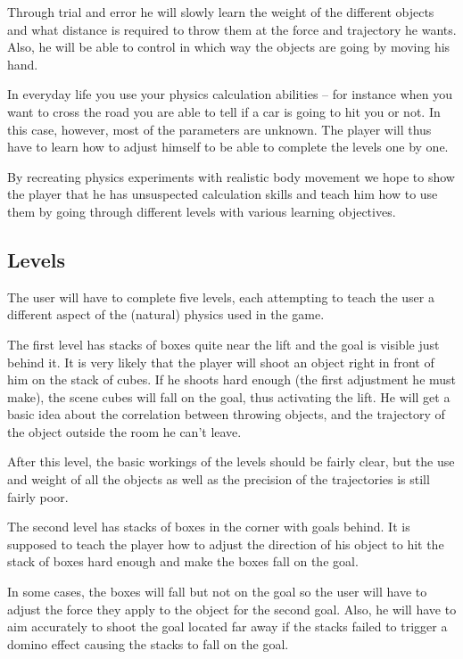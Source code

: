 \documentclass[a4paper]{article}
\begin{document}
Through trial and error he will slowly learn the weight of the different objects
and what distance is required to throw them at the force and trajectory he
wants. Also, he will be able to control in which way the objects are going by
moving his hand.

In everyday life you use your physics calculation abilities -- for instance when
you want to cross the road you are able to tell if a car is going to hit you or
not. In this case, however, most of the parameters are unknown. The player will
thus have to learn how to adjust himself to be able to complete the levels one
by one.

By recreating physics experiments with realistic body movement we hope to show the
player that he has unsuspected calculation skills and teach him how to use them
by going through different levels with various learning objectives.


\subsection{Levels}
The user will have to complete five levels, each attempting to teach the user a
different aspect of the (natural) physics used in the game.

The first level has stacks of boxes quite near the lift and the goal is
visible just behind it. It is very likely that the player will shoot an object
right in front of him on the stack of cubes. If he shoots hard enough (the first
adjustment he must make), the scene cubes will fall on the goal, thus activating the lift.
He will get a basic idea about the correlation between throwing objects, and the
trajectory of the object outside the room he can't leave.

After this level, the basic workings of the levels should be fairly clear, but the
use and weight of all the objects as well as the precision of the trajectories is
still fairly poor.

The second level has stacks of boxes in the corner with goals behind. It is
supposed to teach the player how to adjust the direction of his object to hit the
stack of boxes hard enough and make the boxes fall on the goal.

In some cases, the boxes will fall but not on the goal so the user will have to
adjust the force they apply to the object for the second goal. Also, he will
have to aim accurately to shoot the goal located far away if the stacks failed
to trigger a domino effect causing the stacks to fall on the goal.
\end{document}
